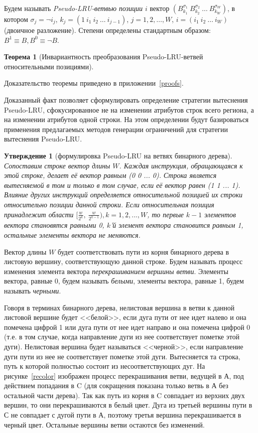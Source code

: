 \documentclass[14pt]{extreport}
\newtheorem{theorem}{Теорема}
\newtheorem{utv}{Утверждение}
\newcommand{\PseudoLRU}{\textsf{Pseudo-LRU}\xspace}
\begin{document}
Будем называть \emph{\PseudoLRU-ветвью позиции $i$} вектор
$(B_{k_1}^{\sigma_1}~B_{k_2}^{\sigma_2}~\dots~B_{k_W}^{\sigma_W})$,
в котором $\sigma_j = \neg i_j$, $k_j = (1~i_1~i_2~\dots~i_{j-1})$,
$j = 1, 2, \dots, W$, $i = (i_1~i_2~\dots~i_W)$ (двоичное
разложение). Степени определены стандартным образом: $B^1 \equiv B,
B^0 \equiv \neg B$.

\begin{theorem}[Инвариантность преобразования \PseudoLRU-ветвей относительными
позициями]\label{thm_pseudoLRU_invariant} \PseudoLRUInvariant
\end{theorem}
Доказательство теоремы приведено в приложении~\ref{proofs}.

Доказанный факт позволяет сформулировать определение стратегии
вытеснения \PseudoLRU, сфокусированное не на изменении атрибутов строк всего региона,
а на изменении атрибутов одной строки. На этом определении
будут базироваться применения предлагаемых методов генерации
ограничений для стратегии вытеснения \PseudoLRU.

\begin{utv}[формулировка \PseudoLRU на ветвях бинарного дерева]
Сопоставим строке вектор длины $W$. Каждая инструкция, обращающаяся к этой строке,
делает её вектор равным (0 0 ... 0). Строка является вытесняемой в
том и только в том случае, если её вектор равен (1 1 ... 1).
Влияние других инструкций определяется относительной позицией их
строки относительно позиции данной строки. Если относительная позиция
принадлежит области $[\frac{w}{2^k},~\frac{w}{2^{k-1}}), k =
1,2,...,W$, то первые $k{-}1$ элементов вектора становятся равными
0, $k$'й элемент вектора становится равным 1, остальные элементы
вектора не меняются.
\end{utv}

Вектор длины $W$ будет соответствовать пути из корня бинарного
дерева в листовую вершину, соответствующую данной строке.
Будем называть процесс изменения элемента вектора
\emph{перекрашиванием вершины ветви}. Элементы вектора, равные 0,
будем называть \emph{белыми}, элементы вектора, равные 1, будем
называть \emph{черными}.

Говоря в терминах бинарного дерева, нелистовая вершина в ветви к
данной листовой вершине будет <<белой>>, если дуга пути от нее идет
налево и она помечена цифрой 1 или дуга пути от нее идет направо и она
помечена цифрой 0 (т.е. в том случае, когда направление дуги из нее
соответствует пометке этой дуги). Нелистовая вершина будет
называться <<черной>>, если направление дуги пути из нее не соответствует
пометке этой дуги. Вытесняется та строка, путь к которой
полностью состоит из несоответствующих дуг. На рисунке~\ref{recolor}
изображен процесс перекрашивания ветви, ведущей в А, под действием
попадания в C (для сокращения показана только ветвь в А без
остальной части дерева). Так как путь из корня в C совпадает из
верхних двух вершин, то они перекрашиваются в белый цвет. Дуга из
третьей вершины пути в С не совпадает с дугой пути в А, поэтому
третья вершина перекрашивается в черный цвет. Остальные вершины
ветви остаются без изменений.
\end{document}
